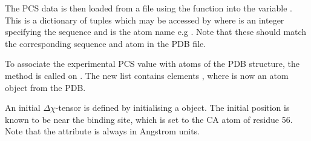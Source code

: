 \documentclass[a4paper,10pt,english,openany,oneside]{sphinxmanual}
\begin{document}
The PCS data is then loaded from a  file using the function {\hyperref[\detokenize{reference/generated/paramagpy.dataparse.read_pcs:paramagpy.dataparse.read_pcs}]{}} into the variable . This is a dictionary of  tuples which may be accessed by  where  is an integer specifying the sequence and  is the atom name e.g . Note that these should match the corresponding sequence and atom in the PDB file.

%
\begin{sphinxVerbatim}[commandchars=\\\{\}]
  
\end{sphinxVerbatim}

To associate the experimental PCS value with atoms of the PDB structure, the method {\hyperref[\detokenize{reference/generated/paramagpy.protein.CustomStructure.parse:paramagpy.protein.CustomStructure.parse}]{}} is called on . The new list  contains elements , where  is now an atom object from the PDB.

%
\begin{sphinxVerbatim}[commandchars=\\\{\}]
  
\end{sphinxVerbatim}

An initial \({\Delta\chi}\)-tensor is defined by initialising a {\hyperref[\detokenize{reference/generated/paramagpy.metal.Metal:paramagpy.metal.Metal}]{}} object. The initial position is known to be near the binding site, which is set to the CA atom of residue 56. Note that the  attribute is always in Angstrom units.
\end{document}
